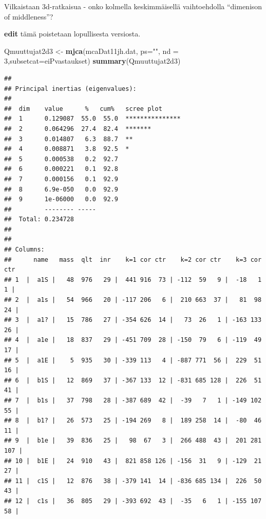 \documentclass[
  finnish,
]{book}
\newenvironment{Shaded}{\begin{snugshade}}{\end{snugshade}}
\newcommand{\DataTypeTok}[1]{\textcolor[rgb]{0.13,0.29,0.53}{#1}}
\newcommand{\DecValTok}[1]{\textcolor[rgb]{0.00,0.00,0.81}{#1}}
\newcommand{\KeywordTok}[1]{\textcolor[rgb]{0.13,0.29,0.53}{\textbf{#1}}}
\newcommand{\NormalTok}[1]{#1}
\newcommand{\StringTok}[1]{\textcolor[rgb]{0.31,0.60,0.02}{#1}}
\begin{document}
Vilkaistaan 3d-ratkaisua - onko kolmella keskimmäisellä vaihtoehdolla ``dimenison
of middleness''?

\textbf{edit} tämä poistetaan lopullisesta versiosta.

\begin{Shaded}
\begin{Highlighting}[]
\NormalTok{Qmuuttujat2d3  <-}\StringTok{ }\KeywordTok{mjca}\NormalTok{(mcaDat11jh.dat, }\DataTypeTok{ps=}\StringTok{""}\NormalTok{, }\DataTypeTok{nd =} \DecValTok{3}\NormalTok{,}\DataTypeTok{subsetcat=}\NormalTok{eiPvastaukset)}
\KeywordTok{summary}\NormalTok{(Qmuuttujat2d3)}
\end{Highlighting}
\end{Shaded}

\begin{verbatim}
## 
## Principal inertias (eigenvalues):
## 
##  dim    value      %   cum%   scree plot               
##  1      0.129087  55.0  55.0  ***************          
##  2      0.064296  27.4  82.4  *******                  
##  3      0.014807   6.3  88.7  **                       
##  4      0.008871   3.8  92.5  *                        
##  5      0.000538   0.2  92.7                           
##  6      0.000221   0.1  92.8                           
##  7      0.000156   0.1  92.9                           
##  8      6.9e-050   0.0  92.9                           
##  9      1e-06000   0.0  92.9                           
##         -------- -----                                 
##  Total: 0.234728                                       
## 
## 
## Columns:
##      name   mass  qlt  inr    k=1 cor ctr    k=2 cor ctr    k=3 cor ctr  
## 1  |  a1S |   48  976   29 |  441 916  73 | -112  59   9 |  -18   1   1 |
## 2  |  a1s |   54  966   20 | -117 206   6 |  210 663  37 |   81  98  24 |
## 3  |  a1? |   15  786   27 | -354 626  14 |   73  26   1 | -163 133  26 |
## 4  |  a1e |   18  837   29 | -451 709  28 | -150  79   6 | -119  49  17 |
## 5  |  a1E |    5  935   30 | -339 113   4 | -887 771  56 |  229  51  16 |
## 6  |  b1S |   12  869   37 | -367 133  12 | -831 685 128 |  226  51  41 |
## 7  |  b1s |   37  798   28 | -387 689  42 |  -39   7   1 | -149 102  55 |
## 8  |  b1? |   26  573   25 | -194 269   8 |  189 258  14 |  -80  46  11 |
## 9  |  b1e |   39  836   25 |   98  67   3 |  266 488  43 |  201 281 107 |
## 10 |  b1E |   24  910   43 |  821 858 126 | -156  31   9 | -129  21  27 |
## 11 |  c1S |   12  876   38 | -379 141  14 | -836 685 134 |  226  50  43 |
## 12 |  c1s |   36  805   29 | -393 692  43 |  -35   6   1 | -155 107  58 |

\end{verbatim}
\end{document}
